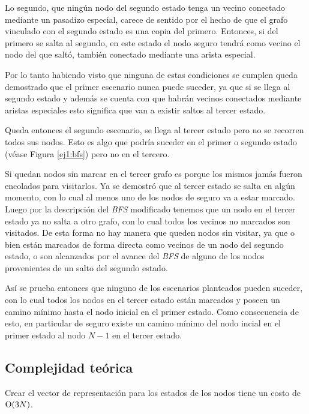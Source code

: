 	Lo segundo, que ningún nodo del segundo estado tenga un vecino conectado
	mediante un pasadizo especial, carece de sentido por el hecho de que el
	grafo vinculado con el segundo estado es una copia del primero. Entonces, si
	del primero se salta al segundo, en este estado el nodo seguro tendrá como
	vecino el nodo del que saltó, también conectado mediante una arista
	especial.

	Por lo tanto habiendo visto que ninguna de estas condiciones se cumplen
	queda demostrado que el primer escenario nunca puede suceder, ya que si se
	llega al segundo estado y además se cuenta con que habrán vecinos conectados
	mediante aristas especiales esto significa que van a existir saltos al
	tercer estado.

	Queda entonces el segundo escenario, se llega al tercer estado pero no se
	recorren todos sus nodos. Esto es algo que podría suceder en el primer o
	segundo estado (véase Figura \ref{ej1:bfs}) pero no en el tercero.

	Si quedan nodos sin marcar en el tercer grafo es porque los mismos jamás
	fueron encolados para visitarlos. Ya se demostró que al tercer estado se
	salta en algún momento, con lo cual al menos uno de los nodos de
	seguro va a estar marcado. Luego por la descripción del \emph{BFS}
	modificado tenemos que un nodo en el tercer estado ya no salta a otro grafo,
	con lo cual todos los vecinos no marcados son visitados. De esta forma no
	hay manera que queden nodos sin visitar, ya que o bien están marcados de
	forma directa como vecinos de un nodo del segundo estado, o son alcanzados por
	el avance del \emph{BFS} de alguno de los nodos provenientes de un salto del segundo estado.

	Así se prueba entonces que ninguno de los escenarios planteados pueden
	suceder, con lo cual todos los nodos en el tercer estado están marcados y
	poseen un camino mínimo hasta el nodo inicial en el primer estado. Como
	consecuencia de esto, en particular de seguro existe un camino mínimo del
	nodo incial en el primer estado al nodo $N - 1$ en el tercer estado.

    \subsection{Complejidad teórica}
    Crear el vector de representación para los estados de los nodos tiene un
	costo de $\operatorname{O}(3N)$.

